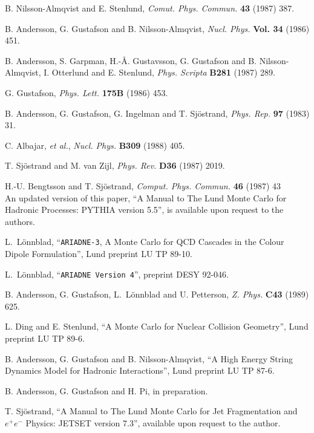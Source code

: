 \newpage
\begin{thebibliography}{99}

 B. Nilsson-Almqvist and E. Stenlund, 
   {\it Comut. Phys. Commun.} {\bf 43} (1987) 387.

 B. Andersson, G. Gustafson and B. Nilsson-Almqvist,
   {\it Nucl. Phys.} {\bf Vol. 34} (1986) 451.

 B. Andersson, S. Garpman, H.-\AA. Gustavsson, 
   G. Gustafson and B. Nilsson-Almqvist, I. Otterlund and E. Stenlund, 
   {\it Phys. Scripta} {\bf B281} (1987) 289.

 G. Gustafson,
   {\it Phys. Lett.} {\bf 175B} (1986) 453.

 B. Andersson, G. Gustafson, G. Ingelman and T. Sj\"ostrand, 
   {\it Phys. Rep.} {\bf 97} (1983) 31.

 C. Albajar, {\it et al.}, 
   {\it Nucl. Phys.} {\bf B309} (1988) 405.


 T. Sj\"ostrand and M. van Zijl,  
   {\it Phys. Rev.} {\bf D36} (1987) 2019. 

 H.-U. Bengtsson and T. Sj\"ostrand, 
   {\it Comput. Phys. Commun.} {\bf 46} (1987) 43 \\
   An updated version of this paper, ``A Manual to The Lund Monte Carlo
   for Hadronic Processes:  PYTHIA version 5.5'', is available upon request
   to the authors.

 L.\ L\"onnblad, 
  ``{\tt ARIADNE-3}, A Monte Carlo for QCD Cascades in the Colour Dipole
     Formulation'', Lund preprint LU TP 89-10.

 L.\ L\"onnblad, 
  ``{\tt ARIADNE Version 4}'',  preprint DESY 92-046.

 B. Andersson, G. Gustafson, L.\ L\"onnblad and U. Petterson,
   {\it Z. Phys.} {\bf C43} (1989) 625.

 L. Ding and E. Stenlund, 
  ``A Monte Carlo for Nuclear Collision Geometry'', Lund preprint LU TP 89-6.

 B. Andersson, G. Gustafson and B. Nilsson-Almqvist,
  ``A High Energy String Dynamics Model for Hadronic Interactions'',
  Lund preprint LU TP 87-6.

 B. Andersson, G. Gustafson and H. Pi,
  in preparation.

 T. Sj\"ostrand, 
   ``A Manual to The Lund Monte Carlo for Jet Fragmentation and
     $e^+e^-$ Physics: JETSET version 7.3'', available upon request
     to the author.


\end{thebibliography}
